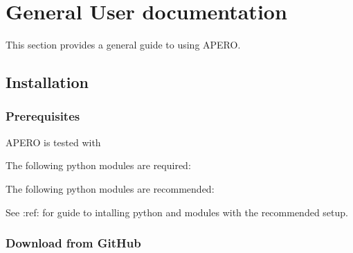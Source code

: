 \documentclass[a4paper,10pt,english]{report}
\begin{document}
\chapter{General User documentation}
\label{\detokenize{user/general_guide:general-user-documentation}}\label{\detokenize{user/general_guide:general-guide}}\label{\detokenize{user/general_guide::doc}}
This section provides a general guide to using APERO.


\section{Installation}
\label{\detokenize{user/general/installation:installation}}\label{\detokenize{user/general/installation:id1}}\label{\detokenize{user/general/installation::doc}}

\subsection{Prerequisites}
\label{\detokenize{user/general/installation:prerequisites}}\label{\detokenize{user/general/installation:installation-prerequisites}}
APERO is tested with 

The following python modules are required:

\begin{sphinxVerbatim}[commandchars=\\\{\}]
\end{sphinxVerbatim}

The following python modules are recommended:

\begin{sphinxVerbatim}[commandchars=\\\{\}]
\end{sphinxVerbatim}

See :ref:  for guide to intalling python and modules with
the recommended setup.


\subsection{Download from GitHub}
\label{\detokenize{user/general/installation:download-from-github}}\label{\detokenize{user/general/installation:installation-download}}
\end{document}
